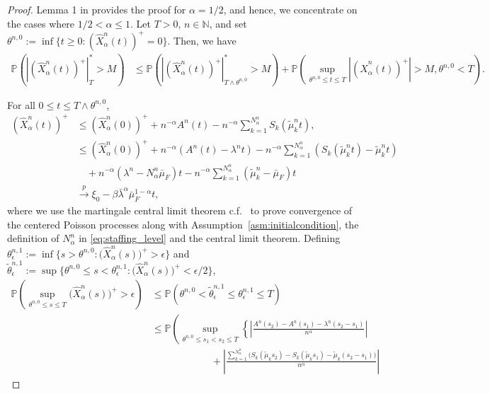 \documentclass[a4paper,11pt,twoside]{article}
\numberwithin{equation}{section}
\numberwithin{figure}{section}
\theoremstyle{plain}
\newcommand{\NN}{\mathbb{N}}
\newcommand{\PP}{\mathbb{P}}
\newcommand{\1}{\mathbbm{1}}
\newcommand{\toP}{\stackrel{p}{\rightarrow}}
\begin{document}
\begin{proof}
Lemma 1 in \cite{bukeqin2019} provides the proof for $\alpha = 1/2$, and hence, we concentrate on the cases where $1/2<\alpha\leq 1$. Let $T>0$, $n\in \NN$, and set $\theta^{n,0}:=\inf\{t\geq 0:(\hat{X}_\alpha^n(t))^+= 0\}$. Then, we have
\begin{align*}
    \PP\left(\left|(\hat{X}_\alpha^n(t))^+\right|_T^*>M\right) 
    & \leq  \PP\left(\left|(\hat{X}_\alpha^n(t))^+\right|_{T\wedge \theta^{n,0}}^*>M\right) 
    + \PP\left(\sup_{\theta^{n,0}\leq t \leq T}\left|(\hat{X}_\alpha^n(t))^+\right|>M, \theta^{n,0}<T\right).
\end{align*}

For all $0\leq t\leq T\wedge \theta^{n,0}$, 
\begin{align}
\nonumber(\hat{X}_\alpha^n(t))^+&\leq (\hat{X}_\alpha^n(0))^+ + n^{-\alpha}A^n(t)-n^{-\alpha}\sum_{k=1}^{N_\alpha^n}S_k(\tilde{\mu}_k^nt),\\
\nonumber&\leq (\hat{X}_\alpha^n(0))^++n^{-\alpha}\left(A^n(t)-\lambda^n t\right)-n^{-\alpha}\sum_{k=1}^{N_\alpha^n}\left(S_k(\tilde{\mu}_k^nt)-\tilde{\mu}_k^nt\right)\\\nonumber&\quad+n^{-\alpha}\left(\lambda^n-N_\alpha^n\bar{\mu}_F\right)t-n^{-\alpha}\sum_{k=1}^{N_\alpha^n}\left(\tilde{\mu}_k^n-\bar{\mu}_F\right)t\\
&\toP \xi_0 - \beta \bar{\lambda}^\alpha\bar{\mu}_F^{1-\alpha}t,\label{eq:conv_xplus}
\end{align}
where we use the martingale central limit theorem c.f.~\cite{ptw07} to prove convergence of the centered Poisson processes along with Assumption~\ref{asm:initialcondition}, the definition of $N_\alpha^n$ in \eqref{eq:staffing_level} and the central limit theorem. 
Defining
$\theta_\epsilon^{n,1}:=\inf\big\{s>\theta^{n,0}:\big(\hat{X}_\alpha^n(s)\big)^+>\epsilon\big\}$  and $\tilde{\theta}_\epsilon^{n,1}:=\sup\big\{\theta^{n,0}\leq s<\theta_\epsilon^{n,1}:\big(\hat{X}_\alpha^n(s)\big)^+<\epsilon/2\big\}$,
\begin{align}
 \nonumber\PP\left(\sup_{\theta^{n,0}\leq s\leq T} \big(\hat{X}_\alpha^n(s)\big)^+>\epsilon\right)
 &\leq\PP\left(\theta^{n,0}<\tilde{\theta}_\epsilon^{n,1}\leq \theta_\epsilon^{n,1}\leq T\right)
 \\
 \nonumber&\leq \PP\left(\sup_{\theta^{n,0}\leq s_1<s_2\leq T} \left\{\left|\frac{A^n(s_2)-A^n(s_1)-\lambda^n(s_2-s_1)}{n^\alpha}\right|\right.\right.
 \\
 \nonumber&\qquad\qquad\qquad+\left.\left
 |\frac{\sum_{k=1}^{N^n_\alpha} \big(S_k(\tilde{\mu}_ks_2)-S_k(\tilde{\mu}_ks_1)-\tilde{\mu}_k(s_2-s_1)\big)}{n^{\alpha}}\right|\right.

\end{align}
\end{proof}
\end{document}
